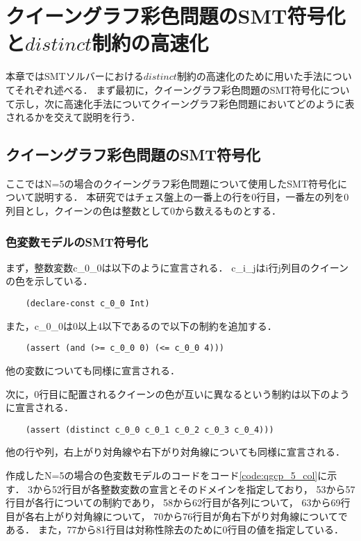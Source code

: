\chapter{クイーングラフ彩色問題のSMT符号化と$distinct$制約の高速化}

本章ではSMTソルバーにおける$distinct$制約の高速化のために用いた手法についてそれぞれ述べる．
まず最初に，クイーングラフ彩色問題のSMT符号化について示し，次に高速化手法についてクイーングラフ彩色問題においてどのように表されるかを交えて説明を行う．

\section{クイーングラフ彩色問題のSMT符号化}
ここではN=5の場合のクイーングラフ彩色問題について使用したSMT符号化について説明する．
本研究ではチェス盤上の一番上の行を0行目，一番左の列を0列目とし，クイーンの色は整数として0から数えるものとする．


\subsection{色変数モデルのSMT符号化}
まず，整数変数c\_0\_0は以下のように宣言される．
c\_i\_jはi行j列目のクイーンの色を示している．
\begin{verbatim}
    (declare-const c_0_0 Int)
\end{verbatim}
また，c\_0\_0は0以上4以下であるので以下の制約を追加する．
\begin{verbatim}
    (assert (and (>= c_0_0 0) (<= c_0_0 4)))
\end{verbatim}
他の変数についても同様に宣言される．

次に，0行目に配置されるクイーンの色が互いに異なるという制約は以下のように宣言される．
\begin{verbatim}
    (assert (distinct c_0_0 c_0_1 c_0_2 c_0_3 c_0_4)))
\end{verbatim}
他の行や列，右上がり対角線や右下がり対角線についても同様に宣言される．


作成したN=5の場合の色変数モデルのコードをコード\ref{code:qgcp_5_col}に示す．
3から52行目が各整数変数の宣言とそのドメインを指定しており，
53から57行目が各行についての制約であり，
58から62行目が各列について，
63から69行目が各右上がり対角線について，
70から76行目が角右下がり対角線についてである．
また，77から81行目は対称性除去のために0行目の値を指定している．

